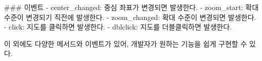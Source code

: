 \documentclass[
  letterpaper,
]{book}
\newenvironment{Shaded}{\begin{snugshade}}{\end{snugshade}}
\newcommand{\FunctionTok}[1]{\textcolor[rgb]{0.28,0.35,0.67}{#1}}
\newcommand{\InformationTok}[1]{\textcolor[rgb]{0.37,0.37,0.37}{#1}}
\newcommand{\NormalTok}[1]{\textcolor[rgb]{0.00,0.23,0.31}{#1}}
\newcommand{\SpecialStringTok}[1]{\textcolor[rgb]{0.13,0.47,0.30}{#1}}
\begin{document}
\begin{tcolorbox}
\begin{Shaded}
\begin{Highlighting}[]
\FunctionTok{\#\#\# 이벤트}
\SpecialStringTok{{-} }\InformationTok{\textasciigrave{}center\_changed\textasciigrave{}}\NormalTok{: 중심 좌표가 변경되면 발생한다.}
\SpecialStringTok{{-} }\InformationTok{\textasciigrave{}zoom\_start\textasciigrave{}}\NormalTok{: 확대 수준이 변경되기 직전에 발생한다.}
\SpecialStringTok{{-} }\InformationTok{\textasciigrave{}zoom\_changed\textasciigrave{}}\NormalTok{: 확대 수준이 변경되면 발생한다.}
\SpecialStringTok{{-} }\InformationTok{\textasciigrave{}click\textasciigrave{}}\NormalTok{: 지도를 클릭하면 발생한다.}
\SpecialStringTok{{-} }\InformationTok{\textasciigrave{}dblclick\textasciigrave{}}\NormalTok{: 지도를 더블클릭하면 발생한다.}

\NormalTok{이 외에도 다양한 메서드와 이벤트가 있어, 개발자가 원하는 기능을 쉽게 구현할 수 있다.}
\end{Highlighting}
\end{Shaded}

\end{tcolorbox}
\end{document}
